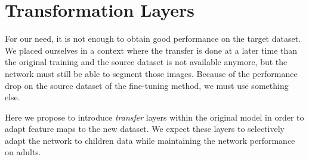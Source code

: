 \section{Transformation Layers}
\label{sec:transfo}

For our need, it is not enough to obtain good performance on the target dataset. We placed ourselves in a context where the transfer is done at a later time than the original training and the source dataset is not available anymore, but the network must still be able to segment those images. Because of the performance drop on the source dataset of the fine-tuning method, we must use something else.

Here we propose to introduce \textit{transfer} layers within the original model in order to adapt feature maps to the new dataset. We expect these layers to selectively adapt the network to children data while maintaining the network performance on adults.



